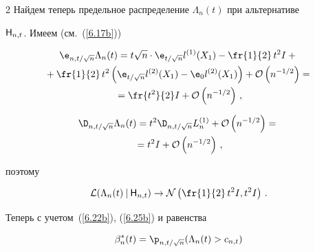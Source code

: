 \begin{multicols}{2}
Найдем теперь предельное распределение $\Lambda_n(t)$ при альтернативе


${\sf H}_{n,t}$. Имеем (см.~(\ref{6.17b}))


\begin{multline*}


{\e}_{n,t/\sqrt{n}}\Lambda_n(t)=


t\sqrt{n}\cdot {\e}_{t/\sqrt{n}}l^{(1)}(X_1)- \fr{1}{2}\,t^2I+{}\\


{}


+\fr{1}{2}\,t^2\left (


{\e}_{t/\sqrt{n}}l^{(2)}(X_1)-{\e}_0l^{(2)}(X_1)\right ) +


{\cal O}\left (n^{-1/2}\right )={}\\


{}=\fr{t^2}{2}I + {\cal


O}\left (n^{-1/2}\right )\,,




\end{multline*}





\noindent


\begin{multline*}


{\D}_{n,t/\sqrt{n}}\Lambda_n(t) =


t^2{\D}_{n,t/\sqrt{n}}L_n^{(1)}+


{\cal O}\left (n^{-1/2}\right )={}\\


{}= t^2I+{\cal O}\left (n^{-1/2}\right )\,,




\end{multline*}


поэтому


\begin{equation}


{\cal L}(\Lambda_n(t)\:|\:{\sf H}_{n,t})\to {\cal N}


\left (\fr{1}{2}\,t^2I,t^2I\right )\,.\label{6.25b}


\end{equation}


Теперь с учетом~(\ref{6.22b}), (\ref{6.25b})  и равенства


$$


\beta_n^*(t) = {\p}_{n,t/\sqrt{n}}(\Lambda_n(t)>c_{n,t})


$$



\end{multicols}
